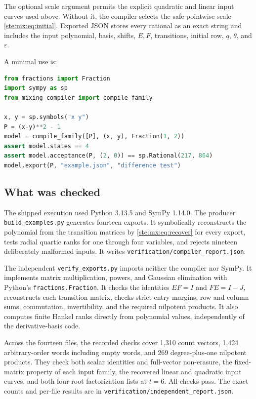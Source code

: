 \documentclass[11pt,letterpaper]{article}
\theoremstyle{definition}
\theoremstyle{remark}
\begin{document}
The optional scale argument permits the explicit quadratic and linear input
curves used above. Without it, the compiler selects the safe pointwise scale
\eqref{ste:mx:eq:initial}. Exported JSON stores every rational as an exact string and
includes the input polynomial, basis, shifts, $E,F$, transitions, initial row,
$q$, $\theta$, and $\varepsilon$.

A minimal use is:
\begin{lstlisting}[language=Python]
from fractions import Fraction
import sympy as sp
from mixing_compiler import compile_family

x, y = sp.symbols("x y")
P = (x-y)**2 - 1
model = compile_family([P], (x, y), Fraction(1, 2))
assert model.states == 4
assert model.acceptance(P, (2, 0)) == sp.Rational(217, 864)
model.export(P, "example.json", "difference test")
\end{lstlisting}

\subsection{What was checked}

The shipped execution used Python 3.13.5 and SymPy 1.14.0. The producer
\texttt{build\_examples.py} generates fourteen exports. It symbolically
reconstructs the polynomial from the transition matrices by \eqref{ste:mx:eq:recover}
for every export, tests radial quartic ranks for one through four variables,
and rejects nineteen deliberately malformed inputs. It writes
\texttt{verification/compiler\_report.json}.

The independent \texttt{verify\_exports.py} imports neither the compiler nor
SymPy. It implements matrix multiplication, powers, and Gaussian elimination
with Python's \texttt{fractions.Fraction}. It checks the identities $EF=I$ and
$FE=I-J$, reconstructs each transition matrix, checks strict entry margins,
row and column sums, commutation, invertibility, and the required nilpotent
products. It also computes finite Hankel ranks directly from polynomial
values, independently of the derivative-basis code.

Across the fourteen files, the recorded checks cover 1,310 count vectors,
1,424 arbitrary-order words including empty words, and 269 degree-plus-one
nilpotent products. They check both scalar identities and full-vector
non-erasure, the fixed-matrix property of each input family, the recovered
linear and quadratic input curves, and both four-root factorization lists at
$t=6$. All checks pass. The exact counts and per-file results are in
\texttt{verification/independent\_report.json}.
\end{document}
